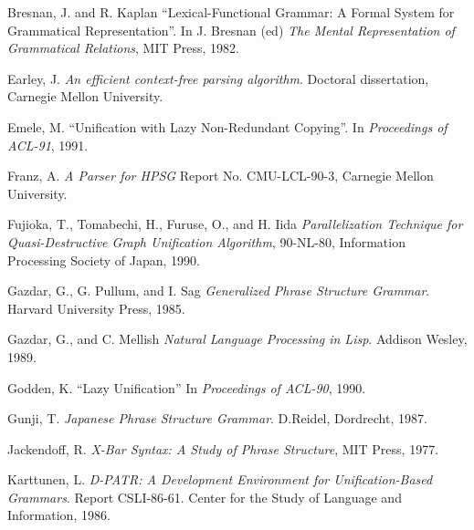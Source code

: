 \begin{thebibliography}{References}
Bresnan, J. and R. Kaplan
``Lexical-Functional Grammar: A Formal System for Grammatical
Representation''.
In J. Bresnan (ed) {\it The Mental Representation of Grammatical
Relations}, MIT Press, 1982.






Earley, J.
{\it An efficient context-free parsing algorithm}. Doctoral
dissertation,
Carnegie Mellon University.


Emele, M.
``Unification with Lazy Non-Redundant Copying''.
In {\it Proceedings of ACL-91}, 1991.




Franz, A.
{\it A Parser for HPSG}
Report No. CMU-LCL-90-3, Carnegie Mellon University.


Fujioka, T., Tomabechi, H., Furuse, O., and H. Iida
{\it Parallelization Technique for Quasi-Destructive Graph Unification
Algorithm}, 90-NL-80, Information Processing Society of Japan, 1990.

 Gazdar, G., G. Pullum, and I. Sag
{\it Generalized Phrase Structure Grammar}.  Harvard University Press, 1985.

Gazdar, G., and C. Mellish
{\it Natural Language Processing in Lisp}.
Addison Wesley, 1989.

Godden, K.
``Lazy Unification''
In {\it Proceedings of ACL-90}, 1990.

Gunji, T.
{\it Japanese Phrase Structure Grammar}.
D.Reidel, Dordrecht, 1987.









Jackendoff, R. {\it X-Bar Syntax: A Study of Phrase Structure}, MIT
Press, 
1977.

Karttunen, L. 
{\it D-PATR: A Development Environment for Unification-Based
Grammars}.
Report CSLI-86-61. Center for the Study of Language and
Information, 1986.



\end{thebibliography}
